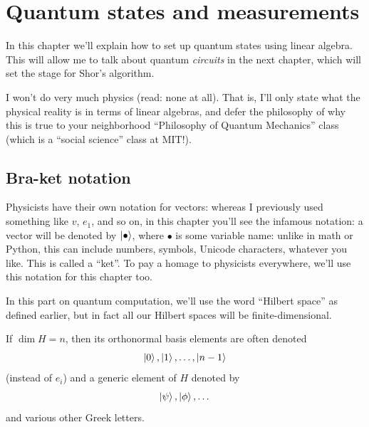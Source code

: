 \chapter{Quantum states and measurements}
\label{ch:quantum_states_and_measurements}
In this chapter we'll explain how to set up quantum states using
linear algebra. This will allow me to talk about quantum \emph{circuits}
in the next chapter, which will set the stage for Shor's algorithm.

I won't do very much physics (read: none at all).
That is, I'll only state what the physical reality is in terms
of linear algebras, and defer the philosophy of why this is true
to your neighborhood ``Philosophy of Quantum Mechanics'' class
(which is a ``social science'' class at MIT!).

\section{Bra-ket notation}
Physicists have their own notation for vectors:
whereas I previously used something like $v$, $e_1$, and so on,
in this chapter you'll see the infamous  notation:
a vector will be denoted by $\ket\bullet$, where $\bullet$ is some
variable name: unlike in math or Python, this can include
numbers, symbols, Unicode characters, whatever you like.
This is called a ``ket''.
To pay a homage to physicists everywhere,
we'll use this notation for this chapter too.

\begin{abuse}
	In this part on quantum computation,
	we'll use the word ``Hilbert space'' as defined earlier,
	but in fact all our Hilbert spaces will be finite-dimensional.
\end{abuse}

If $\dim H = n$, then its orthonormal basis elements are often denoted
\[ \ket0, \ket1, \dots, \ket{n-1} \]
(instead of $e_i$)
and a generic element of $H$ denoted by
\[ \ket\psi, \ket\phi, \dots \]
and various other Greek letters.

